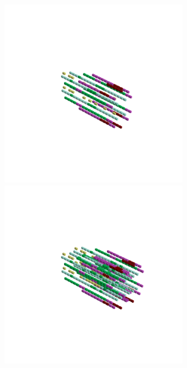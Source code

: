 \begin{minipage}[b]{0.50\linewidth}
\begin{figure}[H]
        \includegraphics[width=8cm]{src/symmetries/pattern10_3-45.png}\\
        \vspace*{-8cm}
        \hspace*{2cm}
        \includegraphics[width=8cm]{src/symmetries/pattern10_4-45.png}
        \vspace*{-2.5cm}
  \caption*{}
  \end{figure}
\end{minipage}
\hspace{1cm}
